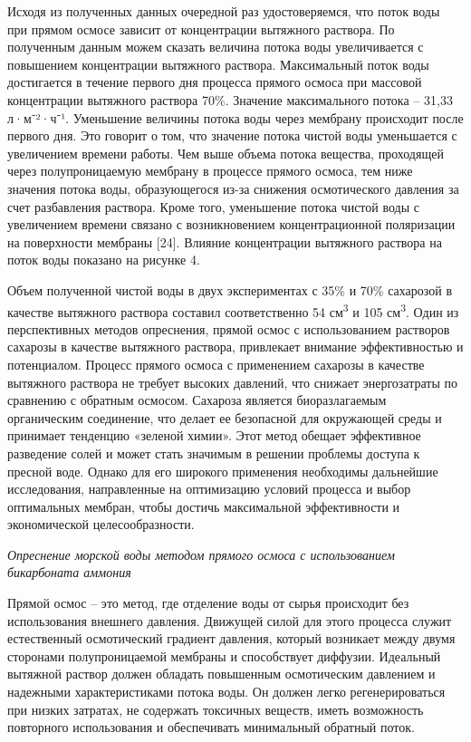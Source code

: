 \begin{multicols}{2}
Исходя из полученных данных очередной раз удостоверяемся, что поток воды
при прямом осмосе зависит от концентрации вытяжного раствора. По
полученным данным можем сказать величина потока воды увеличивается с
повышением концентрации вытяжного раствора. Максимальный поток воды
достигается в течение первого дня процесса прямого осмоса при массовой
концентрации вытяжного раствора 70\%. Значение максимального потока --
31,33 л·м⁻²·ч⁻¹. Уменьшение величины потока воды через мембрану
происходит после первого дня. Это говорит о том, что значение потока
чистой воды уменьшается с увеличением времени работы. Чем выше объема
потока вещества, проходящей через полупроницаемую мембрану в процессе
прямого осмоса, тем ниже значения потока воды, образующегося из-за
снижения осмотического давления за счет разбавления раствора. Кроме
того, уменьшение потока чистой воды с увеличением времени связано с
возникновением концентрационной поляризации на поверхности мембраны
{[}24{]}. Влияние концентрации вытяжного раствора на поток воды показано
на рисунке 4.

Объем полученной чистой воды в двух экспериментах с 35\% и 70\%
сахарозой в качестве вытяжного раствора составил соответственно 54
см\textsuperscript{3} и 105 см\textsuperscript{3}. Один из перспективных
методов опреснения, прямой осмос с использованием растворов сахарозы в
качестве вытяжного раствора, привлекает внимание эффективностью и
потенциалом. Процесс прямого осмоса с применением сахарозы в качестве
вытяжного раствора не требует высоких давлений, что снижает
энергозатраты по сравнению с обратным осмосом. Сахароза является
биоразлагаемым органическим соединение, что делает ее безопасной для
окружающей среды и принимает тенденцию «зеленой химии». Этот метод
обещает эффективное разведение солей и может стать значимым в решении
проблемы доступа к пресной воде. Однако для его широкого применения
необходимы дальнейшие исследования, направленные на оптимизацию условий
процесса и выбор оптимальных мембран, чтобы достичь максимальной
эффективности и экономической целесообразности.

\emph{Опреснение морской воды методом прямого осмоса с использованием
бикарбоната аммония}

Прямой осмос -- это метод, где отделение воды от сырья происходит без
использования внешнего давления. Движущей силой для этого процесса
служит естественный осмотический градиент давления, который возникает
между двумя сторонами полупроницаемой мембраны и способствует диффузии.
Идеальный вытяжной раствор должен обладать повышенным осмотическим
давлением и надежными характеристиками потока воды. Он должен легко
регенерироваться при низких затратах, не содержать токсичных веществ,
иметь возможность повторного использования и обеспечивать минимальный
обратный поток.


\end{multicols}

